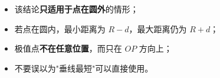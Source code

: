 \begin{trapbox}
\begin{itemize}
  \item 该结论\textbf{只适用于点在圆外}的情形；
  \item 若点在圆内，最小距离为 $R-d$，最大距离仍为 $R+d$；
  \item 极值点\textbf{不在任意位置}，而只在 $OP$ 方向上；
  \item 不要误以为"垂线最短"可以直接使用。
\end{itemize}
\end{trapbox}
